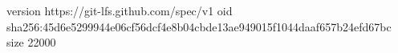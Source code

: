 version https://git-lfs.github.com/spec/v1
oid sha256:45d6e5299944e06cf56dcf4e8b04cbde13ae949015f1044daaf657b24efd67bc
size 22000
